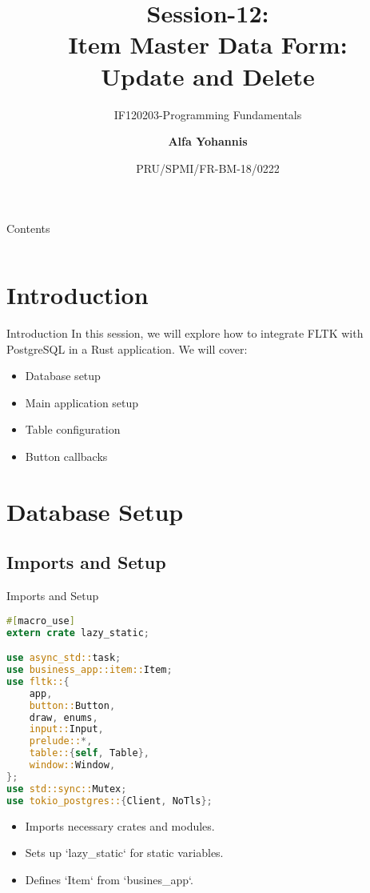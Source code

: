 \documentclass[aspectratio=169, table]{beamer}
\subtitle{IF120203-Programming Fundamentals}
\title{Session-12:\\\LARGE{Item Master Data Form:\\Update and Delete}}
\date[Serial]{\scriptsize {PRU/SPMI/FR-BM-18/0222}}
\author[Pradita]{\small{\textbf{Alfa Yohannis}}}
\begin{document}
\frame{\titlepage}

\begin{frame}{Contents}
\vspace{15pt}
\begin{columns}[t]
\begin{column}{.5\textwidth}
	\tableofcontents[sections={1-3}]
\end{column}
\begin{column}{.5\textwidth}
	\tableofcontents[sections={4-6}]
\end{column}
\end{columns}
\end{frame}


\section{Introduction}
\begin{frame}{Introduction}
In this session, we will explore how to integrate FLTK with PostgreSQL in a Rust application. We will cover:
\begin{itemize}
\item Database setup
\item Main application setup
\item Table configuration
\item Button callbacks
\end{itemize}
\end{frame}

\section{Database Setup}
\subsection{Imports and Setup}
\begin{frame}[fragile]{Imports and Setup}
\begin{lstlisting}[language=Rust]
#[macro_use]
extern crate lazy_static;

use async_std::task;
use business_app::item::Item;
use fltk::{
	app,
	button::Button,
	draw, enums,
	input::Input,
	prelude::*,
	table::{self, Table},
	window::Window,
};
use std::sync::Mutex;
use tokio_postgres::{Client, NoTls};
\end{lstlisting}

\begin{itemize}
\item Imports necessary crates and modules.
\item Sets up `lazy\_static` for static variables.
\item Defines `Item` from `busines\_app`.
\end{itemize}
\end{frame}
\end{document}
